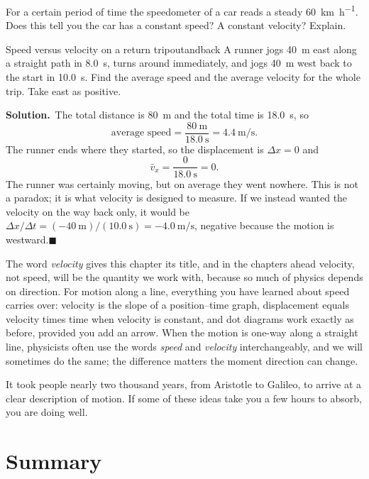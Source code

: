 \documentclass[11pt,twoside,openany]{book}
\newcounter{check}[chapter]
\newcommand{\solution}{\par\smallskip\noindent\textbf{Solution.}\ }
\newcommand{\qed}{\hfill$\blacksquare$}
\begin{document}
\begin{checkbox}
For a certain period of time the speedometer of a car reads a steady \SI{60}{\kilo\metre\per\hour}. Does this tell you the car has a constant speed? A constant velocity? Explain.
\end{checkbox}

\begin{example}{Speed versus velocity on a return trip}{outandback}
A runner jogs \SI{40}{\metre} east along a straight path in \SI{8.0}{\second}, turns around immediately, and jogs \SI{40}{\metre} west back to the start in \SI{10.0}{\second}. Find the average speed and the average velocity for the whole trip. Take east as positive.

\solution The total distance is \SI{80}{\metre} and the total time is \SI{18.0}{\second}, so
\[
\text{average speed} = \frac{\SI{80}{\metre}}{\SI{18.0}{\second}} = \SI{4.4}{\metre\per\second}.
\]
The runner ends where they started, so the displacement is $\Delta x = 0$ and
\[
\bar v_x = \frac{0}{\SI{18.0}{\second}} = 0.
\]
The runner was certainly moving, but on average they went nowhere. This is not a paradox; it is what velocity is designed to measure. If we instead wanted the velocity on the way back only, it would be $\Delta x/\Delta t = (\SI{-40}{\metre})/(\SI{10.0}{\second}) = \SI{-4.0}{\metre\per\second}$, negative because the motion is westward.\qed
\end{example}

The word \emph{velocity} gives this chapter its title, and in the chapters ahead velocity, not speed, will be the quantity we work with, because so much of physics depends on direction. For motion along a line, everything you have learned about speed carries over: velocity is the slope of a position--time graph, displacement equals velocity times time when velocity is constant, and dot diagrams work exactly as before, provided you add an arrow. When the motion is one-way along a straight line, physicists often use the words \emph{speed} and \emph{velocity} interchangeably, and we will sometimes do the same; the difference matters the moment direction can change.

It took people nearly two thousand years, from Aristotle to Galileo, to arrive at a clear description of motion. If some of these ideas take you a few hours to absorb, you are doing well.

\section{Summary}
\end{document}
